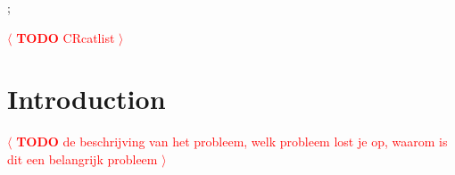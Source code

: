 \documentclass[review]{acmsiggraph}
\newcommand{\todo}[1]{\textcolor{red}{\(\langle\) \textbf{TODO} #1 \(\rangle\) }}
\begin{document}

\begin{CRcatlist}
  ;
\end{CRcatlist}
\todo{CRcatlist}


\keywordlist


\TOGlinkslist


\copyrightspace


\section{Introduction}
\todo{de beschrijving van het probleem, welk probleem lost je op, waarom is dit een belangrijk probleem}
\end{document}

